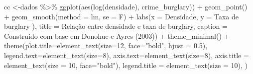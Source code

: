 \documentclass[
]{article}
\newenvironment{Shaded}{\begin{snugshade}}{\end{snugshade}}
\newcommand{\AttributeTok}[1]{\textcolor[rgb]{0.77,0.63,0.00}{#1}}
\newcommand{\DecValTok}[1]{\textcolor[rgb]{0.00,0.00,0.81}{#1}}
\newcommand{\FloatTok}[1]{\textcolor[rgb]{0.00,0.00,0.81}{#1}}
\newcommand{\FunctionTok}[1]{\textcolor[rgb]{0.00,0.00,0.00}{#1}}
\newcommand{\NormalTok}[1]{#1}
\newcommand{\OtherTok}[1]{\textcolor[rgb]{0.56,0.35,0.01}{#1}}
\newcommand{\SpecialCharTok}[1]{\textcolor[rgb]{0.00,0.00,0.00}{#1}}
\newcommand{\StringTok}[1]{\textcolor[rgb]{0.31,0.60,0.02}{#1}}
\begin{document}
\begin{Shaded}
\begin{Highlighting}[]
\NormalTok{cc }\OtherTok{\textless{}{-}}\NormalTok{dados }\SpecialCharTok{\%\textgreater{}\%} 
  \FunctionTok{ggplot}\NormalTok{(}\FunctionTok{aes}\NormalTok{(}\FunctionTok{log}\NormalTok{(densidade), crime\_burglary)) }\SpecialCharTok{+}
  \FunctionTok{geom\_point}\NormalTok{() }\SpecialCharTok{+} 
  \FunctionTok{geom\_smooth}\NormalTok{(}\AttributeTok{method =} \StringTok{\textquotesingle{}lm\textquotesingle{}}\NormalTok{, }\AttributeTok{se =}\NormalTok{ F) }\SpecialCharTok{+}
  \FunctionTok{labs}\NormalTok{(}\AttributeTok{x =} \StringTok{\textquotesingle{}Densidade\textquotesingle{}}\NormalTok{,}
       \AttributeTok{y =} \StringTok{\textquotesingle{}Taxa de burglary )\textquotesingle{}}\NormalTok{,}
       \AttributeTok{title =} \StringTok{\textquotesingle{}Relação entre densidade e taxa de burglary\textquotesingle{}}\NormalTok{,}
       \AttributeTok{caption =} \StringTok{\textquotesingle{}Construido com base em Donohue e Ayres (2003)\textquotesingle{}}\NormalTok{) }\SpecialCharTok{+} 
  \FunctionTok{theme\_minimal}\NormalTok{() }\SpecialCharTok{+}
  \FunctionTok{theme}\NormalTok{(}\AttributeTok{plot.title=}\FunctionTok{element\_text}\NormalTok{(}\AttributeTok{size=}\DecValTok{12}\NormalTok{, }\AttributeTok{face=}\StringTok{"bold"}\NormalTok{, }\AttributeTok{hjust =} \FloatTok{0.5}\NormalTok{),}
        \AttributeTok{legend.text=}\FunctionTok{element\_text}\NormalTok{(}\AttributeTok{size=}\DecValTok{8}\NormalTok{),}
        \AttributeTok{axis.text=}\FunctionTok{element\_text}\NormalTok{(}\AttributeTok{size=}\DecValTok{8}\NormalTok{),}
        \AttributeTok{axis.title =} \FunctionTok{element\_text}\NormalTok{(}\AttributeTok{size =} \DecValTok{10}\NormalTok{, }\AttributeTok{face=}\StringTok{"bold"}\NormalTok{),}
        \AttributeTok{legend.title =} \FunctionTok{element\_text}\NormalTok{(}\AttributeTok{size =} \DecValTok{10}\NormalTok{),}
\NormalTok{  )}



\end{Highlighting}
\end{Shaded}
\end{document}
